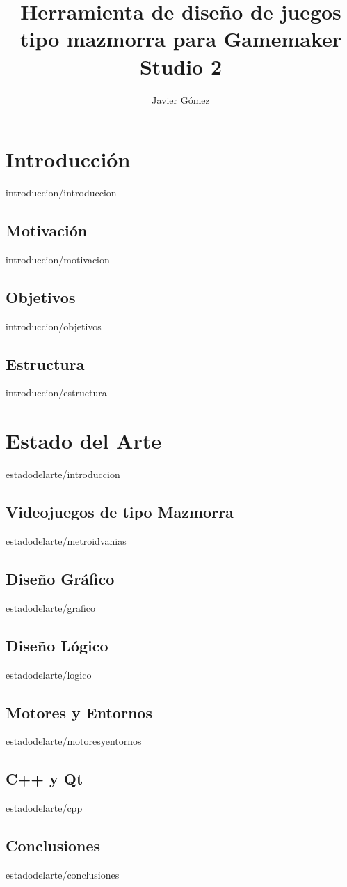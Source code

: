\documentclass[epsbased,lof,loc,copyright,final,extendedindex,firstnumbered,tfg,gnuplot]{tfgtfmthesisuam}
\title{Herramienta de diseño de juegos tipo mazmorra para Gamemaker Studio 2}
\subtitle{}
\author{Javier Gómez}
\begin{document}
\chapter{Introducción\label{CAP:INTRODUCCION}}{introduccion/introduccion}
	\section{Motivación\label{SEC:MOTIVACION}}{introduccion/motivacion}
	\section{Objetivos\label{SEC:OBJETIVOS}}{introduccion/objetivos}
	\section{Estructura\label{SEC:ESTRUCTURA}}{introduccion/estructura}
	
\chapter{Estado del Arte\label{CAP:ESTADODELARTE}}{estadodelarte/introduccion}
	\section{Videojuegos de tipo Mazmorra\label{SEC:METROIDVANIAS}}{estadodelarte/metroidvanias}
	\section{Diseño Gráfico\label{SEC:DISENOGRAFICO}}{estadodelarte/grafico}
	\section{Diseño Lógico\label{SEC:DISENOLOGICO}}{estadodelarte/logico}
	\section{Motores y Entornos\label{SEC:MOTORESYENTORNOS}}{estadodelarte/motoresyentornos}
	\section{C++ y Qt\label{SEC:C++QT}}{estadodelarte/cpp}
	\section{Conclusiones\label{SEC:ESTADODELARTECONCLUSIONES}}{estadodelarte/conclusiones}
	
\end{document}
